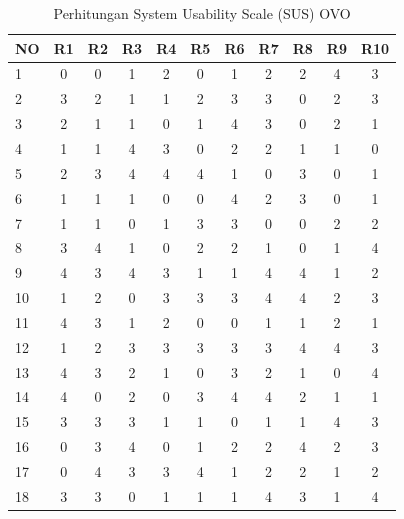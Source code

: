 \documentclass[
 manuscript=article,  %
  layout=publish, 
  year=2024, 
  month= Februari, %
  volume=8,
  number=1 
]{JIKO}
\begin{document}
\begin{table}[hbt!]
    \begin{threeparttable}
        \caption{Perhitungan System Usability Scale (SUS) OVO}
        \label{tabel:sus_ovo}
        \begin{tabular}{l*{10}{c}}
            \toprule
            \textbf{NO} & \textbf{R1} & \textbf{R2} & \textbf{R3} & \textbf{R4} & \textbf{R5} & \textbf{R6} & \textbf{R7} & \textbf{R8} & \textbf{R9} & \textbf{R10} \\
            \midrule
            1  & 0 & 0 & 1 & 2 & 0 & 1 & 2 & 2 & 4 & 3 \\
            \hline
            2  & 3 & 2 & 1 & 1 & 2 & 3 & 3 & 0 & 2 & 3 \\
            \hline
            3  & 2 & 1 & 1 & 0 & 1 & 4 & 3 & 0 & 2 & 1 \\
            \hline
            4  & 1 & 1 & 4 & 3 & 0 & 2 & 2 & 1 & 1 & 0 \\
            \hline
            5  & 2 & 3 & 4 & 4 & 4 & 1 & 0 & 3 & 0 & 1 \\
            \hline
            6  & 1 & 1 & 1 & 0 & 0 & 4 & 2 & 3 & 0 & 1 \\
            \hline
            7  & 1 & 1 & 0 & 1 & 3 & 3 & 0 & 0 & 2 & 2 \\
            \hline
            8  & 3 & 4 & 1 & 0 & 2 & 2 & 1 & 0 & 1 & 4 \\
            \hline
            9  & 4 & 3 & 4 & 3 & 1 & 1 & 4 & 4 & 1 & 2 \\
            \hline
            10 & 1 & 2 & 0 & 3 & 3 & 3 & 4 & 4 & 2 & 3 \\
            \hline
            11 & 4 & 3 & 1 & 2 & 0 & 0 & 1 & 1 & 2 & 1 \\
            \hline
            12 & 1 & 2 & 3 & 3 & 3 & 3 & 3 & 4 & 4 & 3 \\
            \hline
            13 & 4 & 3 & 2 & 1 & 0 & 3 & 2 & 1 & 0 & 4 \\
            \hline
            14 & 4 & 0 & 2 & 0 & 3 & 4 & 4 & 2 & 1 & 1 \\
            \hline
            15 & 3 & 3 & 3 & 1 & 1 & 0 & 1 & 1 & 4 & 3 \\
            \hline
            16 & 0 & 3 & 4 & 0 & 1 & 2 & 2 & 4 & 2 & 3 \\
            \hline
            17 & 0 & 4 & 3 & 3 & 4 & 1 & 2 & 2 & 1 & 2 \\
            \hline
            18 & 3 & 3 & 0 & 1 & 1 & 1 & 4 & 3 & 1 & 4 \\

\end{tabular}
\end{threeparttable}
\end{table}
\end{document}
